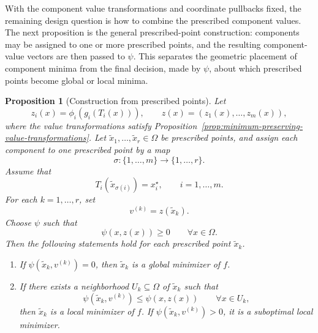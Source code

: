 \documentclass[11pt,a4paper]{article}
\theoremstyle{remark}
\theoremstyle{plain}
\newtheorem{proposition}{Proposition}
\begin{document}
With the component value transformations and coordinate pullbacks fixed, the
remaining design question is how to combine the prescribed component values.
The next proposition is the general prescribed-point construction: components
may be assigned to one or more prescribed points, and the resulting
component-value vectors are then passed to \(\psi\). This separates the
geometric placement of component minima from the final decision, made by
\(\psi\), about which prescribed points become global or local minima.

\begin{proposition}[Construction from prescribed points]
	\label{thm:prescribed-point-construction}
	Let
	\[
	z_i(x)=\phi_i(g_i(T_i(x))),
	\qquad
	z(x)=(z_1(x),\ldots,z_m(x)),
	\]
	where the value transformations satisfy
	Proposition~\ref{prop:minimum-preserving-value-transformations}. Let
	\(\tilde x_1,\ldots,\tilde x_r\in\Omega\) be prescribed points, and assign
	each component to one prescribed point by a map
	\[
	\sigma:\{1,\ldots,m\}\to\{1,\ldots,r\}.
	\]
	Assume that
	\[
	T_i(\tilde x_{\sigma(i)})=x_i^\star,
	\qquad i=1,\ldots,m.
	\label{eq:prescribed-point-assignment}
	\]
	For each \(k=1,\ldots,r\), set
	\[
	v^{(k)}=z(\tilde x_k).
	\label{eq:prescribed-component-vector}
	\]
	Choose \(\psi\) such that
	\[
	\psi(x,z(x))\ge0
	\qquad
	\forall x\in\Omega.
	\]
	Then the following statements hold for each prescribed point \(\tilde x_k\).
	
	\begin{enumerate}
		\item If \(\psi(\tilde x_k,v^{(k)})=0\), then \(\tilde x_k\) is a global
		minimizer of \(f\).
		
		\item If there exists a neighborhood \(U_k\subseteq\Omega\) of
		\(\tilde x_k\) such that
		\[
		\psi(\tilde x_k,v^{(k)})
		\le
		\psi(x,z(x))
		\qquad
		\forall x\in U_k,
		\label{eq:prescribed-point-local-condition}
		\]
		then \(\tilde x_k\) is a local minimizer of \(f\). If
		\(\psi(\tilde x_k,v^{(k)})>0\), it is a suboptimal local minimizer.
	\end{enumerate}
\end{proposition}
\end{document}
